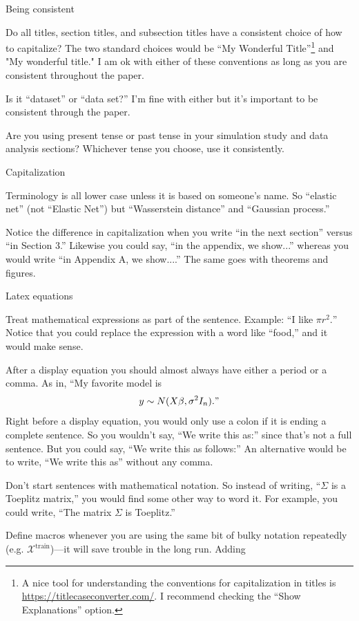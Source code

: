 \documentclass[11pt]{article}
\begin{document}
\begin{todolist}
\item Being consistent
  \begin{todolist}
  \item Do all titles, section titles, and subsection titles have a
    consistent choice of how to capitalize?  The two standard choices
    would be ``My Wonderful Title''\footnote{A nice tool for understanding
    the conventions for capitalization in titles is
    \url{https://titlecaseconverter.com/}. I recommend checking the
    ``Show Explanations'' option.} and "My wonderful title."  I am ok with
    either of these conventions as long as you are consistent
    throughout the paper.
  \item Is it ``dataset'' or ``data set?''  I'm fine with either but
    it's important to be consistent through the paper.
    \item Are you using present tense or past tense in your simulation
      study and data analysis sections?  Whichever tense you choose,
      use it consistently.  
  \end{todolist}
\item Capitalization
  \begin{todolist}
  \item Terminology is all lower case unless it is based on someone's
    name.  So ``elastic net'' (not ``Elastic Net'') but ``Wasserstein
    distance'' and ``Gaussian process.''
    \item 
Notice the difference in capitalization when you write ``in the next section'' versus ``in Section 3.''  Likewise you could say, ``in the appendix, we show...'' whereas you would write ``in Appendix A, we show....''  The same goes with theorems and figures.
  \end{todolist}
\item Latex equations
  \begin{todolist}
\item Treat mathematical expressions as part of the sentence.  Example: ``I like
  $\pi r^2.$''  Notice that you could replace the expression with a
  word like ``food,'' and it would make sense.
\item After a display equation you should almost always have either a period or a comma.  As in, ``My favorite model is $$y\sim N(X\beta, \sigma^2I_n)."$$
Right before a display equation, you would only use a colon if it is
ending a complete sentence. So you wouldn't say, ``We write this as:'' since that's not a full sentence. But you could say, ``We write this as follows:''  An alternative would be to write, ``We write this as'' without any comma.
\item Don't start sentences with mathematical notation.  So instead of
  writing, ``$\Sigma$ is a Toeplitz matrix,'' you would find some
  other way to word it.  For example, you could write, ``The matrix
  $\Sigma$ is Toeplitz.''
\item Define macros whenever you are using the same bit of bulky
  notation repeatedly (e.g. $\mathcal X^{\text{train}}$)---it will save trouble
  in the long run.  Adding 


\end{todolist}
\end{todolist}
\end{document}
